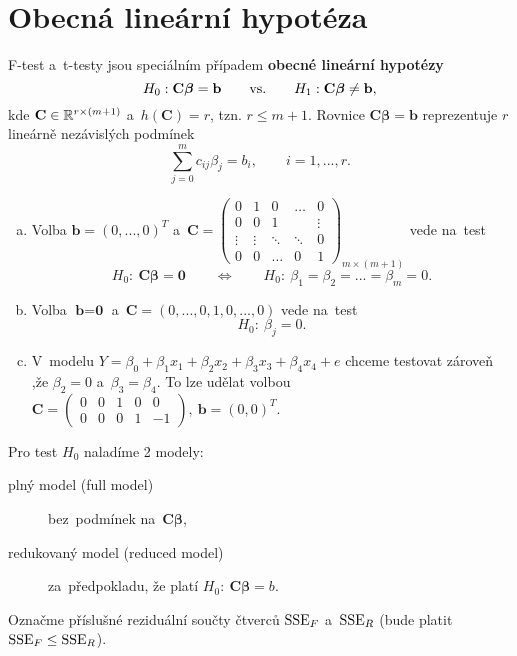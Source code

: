 \section{Obecná lineární hypotéza}
F-test a~t-testy jsou speciálním případem \textbf{obecné lineární hypotézy}
$$ H_0: \textbf{C}\boldsymbol{\beta}=\textbf{b} \qquad\text{vs.}\qquad H_1: \textbf{C}\boldsymbol{\beta}\neq\textbf{b},$$
kde $\textbf{C}\in\mathbb{R}^{r\times(m+1)}$ a~$h(\textbf{C})=r$, tzn. $r\leq m+1$. Rovnice $\textbf{C}\boldsymbol{\beta}=\textbf{b}$ reprezentuje $r$ lineárně nezávislých podmínek 
$$ \sum_{j=0}^m c_{ij}\beta_j=b_i,\qquad i=1,...,r.$$
\begin{remark}
	\begin{enumerate}[a)]
		\item Volba $\textbf{b}=(0,...,0)^T$ a~$\textbf{C}=\left(\begin{array}{c|cccc}
		0 & 1 & 0 & \dots & 0 \\\hline
		0 & 0 & 1 &  & \vdots \\
		\vdots& \vdots & \ddots & \ddots & 0 \\
		0 & 0 & \dots & 0 & 1
		\end{array}
		\right)_{m\times(m+1)}$ vede na~test 
		$$ H_0:~\textbf{C}\boldsymbol{\beta}=\textbf{0}\qquad\Leftrightarrow\qquad H_0:~\beta_1=\beta_2=...=\beta_m=0.$$
		\item Volba $\textbf{b}=\textbf{0}$ a~$\textbf{C}=(0,...,0,1,0,...,0)$ vede na~test 
		$$ H_0:~\beta_j=0.$$
		\item V~modelu $Y=\beta_0+\beta_1x_1+\beta_2x_2+\beta_3x_3+\beta_4x_4+e$ chceme testovat zároveň ,že $\beta_2=0$ a~$\beta_3=\beta_4$. To lze udělat volbou $\textbf{C}=\left(\begin{array}{ccccc}
		0 & 0 & 1 & 0 & 0 \\
		0 & 0 & 0 & 1 & -1
		\end{array}
		 \right),~\textbf{b}=(0,0)^T$.
	\end{enumerate}
\end{remark} 

Pro test $H_0$ naladíme 2 modely:\begin{description}
\item[plný model (full model)] bez~podmínek na~$\textbf{C}\boldsymbol{\beta}$,
\item[redukovaný model (reduced model)] za~předpokladu, že platí $H_0:~\textbf{C}\boldsymbol{\beta}=b$. 
\end{description}

Označme příslušné reziduální součty čtverců $\mathrm{SSE}_F$ a~$\mathrm{SSE}_R$ (bude platit $\mathrm{SSE}_F\leq\mathrm{SSE}_R$).

